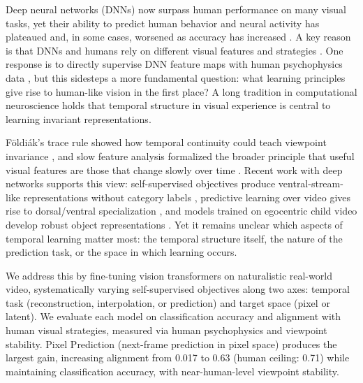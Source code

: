 \documentclass[submission]{ccn}  %
\begin{document}
Deep neural networks (DNNs) now surpass human performance on many visual tasks, yet their ability to predict human behavior and neural activity has plateaued and, in some cases, worsened as accuracy has increased \citep{LINSLEY2025}. A key reason is that DNNs and humans rely on different visual features and strategies \citep{geirhos2022imagenettrainedcnnsbiasedtexture}. One response is to directly supervise DNN feature maps with human psychophysics data \citep{fel2022harmonizing}, but this sidesteps a more fundamental question: what learning principles give rise to human-like vision in the first place? A long tradition in computational neuroscience holds that temporal structure in visual experience is central to learning invariant representations. 

F\"{o}ldi\'{a}k's trace rule showed how temporal continuity could teach viewpoint invariance \citep{foldiak1991learning}, and slow feature analysis formalized the broader principle that useful visual features are those that change slowly over time \citep{wiskott2002slow}. Recent work with deep networks supports this view: self-supervised objectives produce ventral-stream-like representations without category labels \citep{zhuang2021unsupervised}, predictive learning over video gives rise to dorsal/ventral specialization \citep{bakhtiari2021functional}, and models trained on egocentric child video develop robust object representations \citep{orhan2024child, lake2017building}. Yet it remains unclear which aspects of temporal learning matter most: the temporal structure itself, the nature of the prediction task, or the space in which learning occurs.

We address this by fine-tuning vision transformers \citep{dosovitskiy2020vit} on naturalistic real-world video, systematically varying self-supervised objectives along two axes: temporal task (reconstruction, interpolation, or prediction) and target space (pixel or latent). We evaluate each model on classification accuracy and alignment with human visual strategies, measured via human psychophysics and viewpoint stability. Pixel Prediction (next-frame prediction in pixel space) produces the largest gain, increasing alignment from 0.017 to 0.63 (human ceiling: 0.71) while maintaining classification accuracy, with near-human-level viewpoint stability. 

\end{document}
